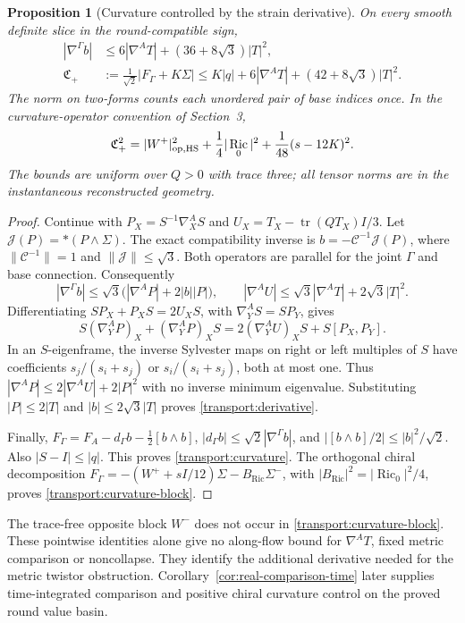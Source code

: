\documentclass[11pt]{article}
\numberwithin{equation}{section}
\newtheorem{proposition}[theorem]{Proposition}
\theoremstyle{definition}
\theoremstyle{remark}
\DeclareMathOperator{\Ric}{Ric}
\DeclareMathOperator{\tr}{tr}
\begin{document}
\begin{proposition}[Curvature controlled by the strain derivative]
\label{prop:transport-curvature}
On every smooth definite slice in the round-compatible sign,
\begin{align}
 |\nabla^\Gamma b|&\leq6|\nabla^A T|+(36+8\sqrt3)|T|^2,\label{transport:derivative}\\
 \mathfrak C_+&:=\frac1{\sqrt2}|F_\Gamma+K\Sigma|
 \leq K|q|+6|\nabla^A T|+(42+8\sqrt3)|T|^2.\label{transport:curvature}
\end{align}
The norm on two-forms counts each unordered pair of base indices once.
In the curvature-operator convention of Section~3,
\begin{equation}\label{transport:curvature-block}
 \mathfrak C_+^2=|W^+|_{\rm op,HS}^2+\frac14|\Ric_0|^2
                         +\frac1{48}(s-12K)^2.
\end{equation}
The bounds are uniform over $Q>0$ with trace three; all tensor norms
are in the instantaneous reconstructed geometry.
\end{proposition}
\begin{proof}
Continue with $P_X=S^{-1}\nabla_X^A S$ and
$U_X=T_X-\tr(QT_X)I/3$. Let $\mathcal J(P)=*(P\wedge\Sigma)$.
The exact compatibility inverse is $b=-\mathscr C^{-1}\mathcal J(P)$,
where $\|\mathscr C^{-1}\|=1$ and $\|\mathcal J\|\leq\sqrt3$.
Both operators are parallel for the joint $\Gamma$ and base connection.
Consequently
\[
 |\nabla^\Gamma b|\leq\sqrt3\bigl(|\nabla^A P|+2|b||P|\bigr),\qquad
 |\nabla^A U|\leq\sqrt3|\nabla^A T|+2\sqrt3|T|^2.
\]
Differentiating $SP_X+P_XS=2U_XS$, with $\nabla_Y^A S=SP_Y$, gives
\[
 S(\nabla_Y^A P)_X+(\nabla_Y^A P)_XS
       =2(\nabla_Y^A U)_XS+S[P_X,P_Y].
\]
In an $S$-eigenframe, the inverse Sylvester maps on right or left
multiples of $S$ have coefficients $s_j/(s_i+s_j)$ or
$s_i/(s_i+s_j)$, both at most one. Thus
$|\nabla^A P|\leq2|\nabla^A U|+2|P|^2$ with no inverse minimum
eigenvalue. Substituting $|P|\leq2|T|$ and $|b|\leq2\sqrt3|T|$
proves \eqref{transport:derivative}.

Finally,
$F_\Gamma=F_A-d_\Gamma b-\tfrac12[b\wedge b]$,
$|d_\Gamma b|\leq\sqrt2|\nabla^\Gamma b|$, and
$|[b\wedge b]/2|\leq|b|^2/\sqrt2$.
Also $|S-I|\leq|q|$. This proves \eqref{transport:curvature}.
The orthogonal chiral decomposition
$F_\Gamma=-(W^++sI/12)\Sigma-B_{\Ric}\Sigma^-$, with
$|B_{\Ric}|^2=|\Ric_0|^2/4$, proves \eqref{transport:curvature-block}.
\end{proof}

The trace-free opposite block $W^-$ does not occur in
\eqref{transport:curvature-block}. These pointwise identities alone give no along-flow bound
for $\nabla^A T$, fixed metric comparison or noncollapse.
They identify the additional derivative needed for the metric
twistor obstruction. Corollary~\ref{cor:real-comparison-time}
later supplies time-integrated comparison and positive chiral
curvature control on the proved round value basin.
\end{document}
